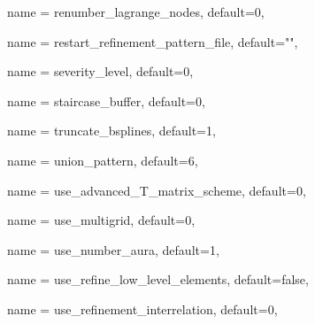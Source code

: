 \begin{parameter}{
    name = {renumber_lagrange_nodes},
    default={0},
    }
\end{parameter}

\begin{parameter}{
    name = {restart_refinement_pattern_file},
    default={""},
    }
\end{parameter}

\begin{parameter}{
    name = {severity_level},
    default={0},
    }
\end{parameter}

\begin{parameter}{
    name = {staircase_buffer},
    default={0},
    }
\end{parameter}

\begin{parameter}{
    name = {truncate_bsplines},
    default={1},
    }
\end{parameter}

\begin{parameter}{
    name = {union_pattern},
    default={6},
    }
\end{parameter}

\begin{parameter}{
    name = {use_advanced_T_matrix_scheme},
    default={0},
    }
\end{parameter}

\begin{parameter}{
    name = {use_multigrid},
    default={0},
    }
\end{parameter}

\begin{parameter}{
    name = {use_number_aura},
    default={1},
    }
\end{parameter}

\begin{parameter}{
    name = {use_refine_low_level_elements},
    default={false},
    }
\end{parameter}

\begin{parameter}{
    name = {use_refinement_interrelation},
    default={0},
    }
\end{parameter}

